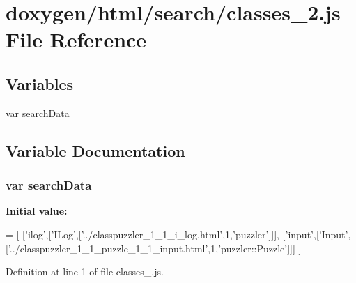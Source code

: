 \hypertarget{a00063}{}\section{doxygen/html/search/classes\+\_\+2.js File Reference}
\label{a00063}
\subsection*{Variables}
\begin{DoxyCompactItemize}
\item 
var \hyperlink{a00063_ad01a7523f103d6242ef9b0451861231e}{search\+Data}
\end{DoxyCompactItemize}


\subsection{Variable Documentation}
\hypertarget{a00063_ad01a7523f103d6242ef9b0451861231e}{}
\subsubsection[{search\+Data}]{\setlength{\rightskip}{0pt plus 5cm}var search\+Data}\label{a00063_ad01a7523f103d6242ef9b0451861231e}
{\bfseries Initial value\+:}
\begin{DoxyCode}
=
[
  [\textcolor{stringliteral}{'ilog'},[\textcolor{stringliteral}{'ILog'},[\textcolor{stringliteral}{'../classpuzzler\_1\_1\_i\_log.html'},1,\textcolor{stringliteral}{'puzzler'}]]],
  [\textcolor{stringliteral}{'input'},[\textcolor{stringliteral}{'Input'},[\textcolor{stringliteral}{'../classpuzzler\_1\_1\_puzzle\_1\_1\_input.html'},1,\textcolor{stringliteral}{'puzzler::Puzzle'}]]]
]
\end{DoxyCode}


Definition at line 1 of file classes\+\_.\+js.

